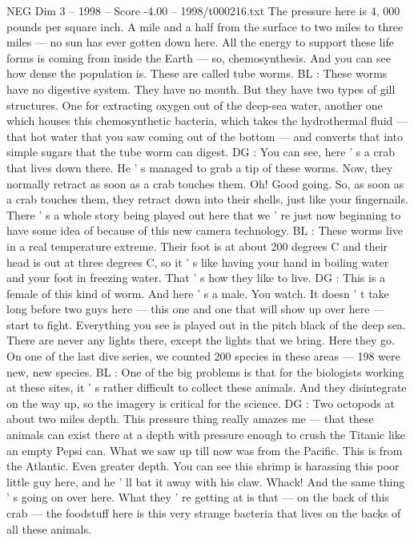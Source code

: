 \begin{textsample}{NEG Dim 3 – 1998 – Score -4.00 – 1998/t000216.txt}
The pressure here is 4, 000 pounds per square inch.
A mile and a half from the surface to two miles to three miles — no sun has ever gotten down here.
All the energy to support these life forms is coming from inside the Earth — so, chemosynthesis.
And you can see how dense the population is.
These are called tube worms.
BL : These worms have no digestive system.
They have no mouth.
But they have two types of gill structures.
One for extracting oxygen out of the deep-sea water, another one which houses this chemosynthetic bacteria, which takes the hydrothermal fluid — that hot water that you saw coming out of the bottom — and converts that into simple sugars that the tube worm can digest.
DG : You can see, here ' s a crab that lives down there.
He ' s managed to grab a tip of these worms.
Now, they normally retract as soon as a crab touches them.
Oh!
Good going.
So, as soon as a crab touches them, they retract down into their shells, just like your fingernails.
There ' s a whole story being played out here that we ' re just now beginning to have some idea of because of this new camera technology.
BL : These worms live in a real temperature extreme.
Their foot is at about 200 degrees C and their head is out at three degrees C, so it ' s like having your hand in boiling water and your foot in freezing water.
That ' s how they like to live.
DG : This is a female of this kind of worm.
And here ' s a male.
You watch.
It doesn ' t take long before two guys here — this one and one that will show up over here — start to fight.
Everything you see is played out in the pitch black of the deep sea.
There are never any lights there, except the lights that we bring.
Here they go.
On one of the last dive series, we counted 200 species in these areas — 198 were new, new species.
BL : One of the big problems is that for the biologists working at these sites, it ' s rather difficult to collect these animals.
And they disintegrate on the way up, so the imagery is critical for the science.
DG : Two octopods at about two miles depth.
This pressure thing really amazes me — that these animals can exist there at a depth with pressure enough to crush the Titanic like an empty Pepsi can.
What we saw up till now was from the Pacific.
This is from the Atlantic.
Even greater depth.
You can see this shrimp is harassing this poor little guy here, and he ' ll bat it away with his claw.
Whack!
And the same thing ' s going on over here.
What they ' re getting at is that — on the back of this crab — the foodstuff here is this very strange bacteria that lives on the backs of all these animals.

\end{textsample}
